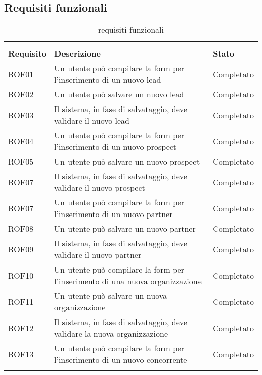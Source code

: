 \subsection*{Requisiti funzionali}
\begin{longtable}[h]{|p{2.5cm}|p{8cm}|p{2.5cm}|}
	\caption{requisiti funzionali}\\
	\label{tab:requisiti-funzionali}\\
	\hline
	\rule[-4mm]{0mm}{1cm}	
	\textbf{Requisito} & \textbf{Descrizione} & \textbf{Stato}\\
	\hline
	\rule[-3mm]{0mm}{0.8cm}	
	ROF01&Un utente può compilare la form per l'inserimento di un nuovo lead&Completato\\
	\hline
	\rule[-3mm]{0mm}{0.8cm}
	ROF02&Un utente può salvare un nuovo lead&Completato\\
	\hline
	\rule[-3mm]{0mm}{0.8cm}
	ROF03&Il sistema, in fase di salvataggio, deve validare il nuovo lead &Completato\\
	\hline
	\rule[-3mm]{0mm}{0.8cm}
	ROF04&Un utente può compilare la form per l'inserimento di un nuovo prospect &Completato\\
	\hline
	\rule[-3mm]{0mm}{0.8cm}
	ROF05&Un utente può salvare un nuovo prospect&Completato\\
	\hline
	\rule[-3mm]{0mm}{0.8cm}
	ROF07&Il sistema, in fase di salvataggio, deve validare il nuovo prospect&Completato \\
	\hline
	\rule[-3mm]{0mm}{0.8cm}
	ROF07&Un utente può compilare la form per l'inserimento di un nuovo partner  & Completato\\
	\hline
	\rule[-3mm]{0mm}{0.8cm}
	ROF08&Un utente può salvare un nuovo partner&Completato\\
	\hline
	\rule[-3mm]{0mm}{0.8cm}
	ROF09&Il sistema, in fase di salvataggio, deve validare il nuovo partner&Completato \\
	\hline
	\rule[-3mm]{0mm}{0.8cm}
	ROF10&Un utente può compilare la form per l'inserimento di una nuova organizzazione  & Completato\\
	\hline
	\rule[-3mm]{0mm}{0.8cm}
	ROF11&Un utente può salvare un nuova organizzazione&Completato\\
	\hline
	\rule[-3mm]{0mm}{0.8cm}
	ROF12&Il sistema, in fase di salvataggio, deve validare la nuova organizzazione&Completato \\
	\hline
	\rule[-3mm]{0mm}{0.8cm}
	ROF13&Un utente può compilare la form per l'inserimento di un nuovo concorrente  & Completato\\
	\hline
	\rule[-3mm]{0mm}{0.8cm}

\end{longtable}
